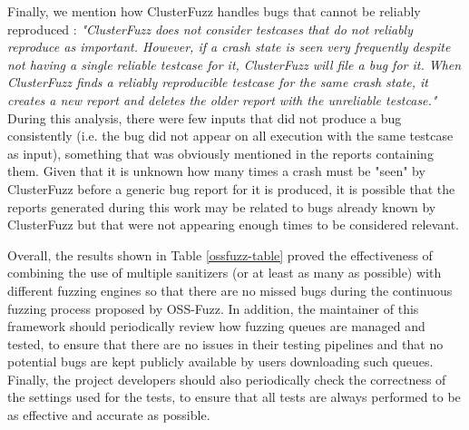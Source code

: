 Finally, we mention how ClusterFuzz handles bugs that cannot be reliably reproduced \cite{unreliable}: \textit{"ClusterFuzz does not consider testcases that do not reliably reproduce as important. However, if a crash state is seen very frequently despite not having a single reliable testcase for it, ClusterFuzz will file a bug for it. When ClusterFuzz finds a reliably reproducible testcase for the same crash state, it creates a new report and deletes the older report with the unreliable testcase."} During this analysis, there were few inputs that did not produce a bug consistently (i.e. the bug did not appear on all execution with the same testcase as input), something that was obviously mentioned in the reports containing them. Given that it is unknown how many times a crash must be "seen" by ClusterFuzz before a generic bug report for it is produced, it is possible that the reports generated during this work may be related to bugs already known by ClusterFuzz but that were not appearing enough times to be considered relevant.

Overall, the results shown in Table \ref{ossfuzz-table} proved the effectiveness of combining the use of multiple sanitizers (or at least as many as possible) with different fuzzing engines so that there are no missed bugs during the continuous fuzzing process proposed by OSS-Fuzz. In addition, the maintainer of this framework should periodically review how fuzzing queues are managed and tested, to ensure that there are no issues in their testing pipelines and that no potential bugs are kept publicly available by users downloading such queues. Finally, the project developers should also periodically check the correctness of the settings used for the tests, to ensure that all tests are always performed to be as effective and accurate as possible.  

